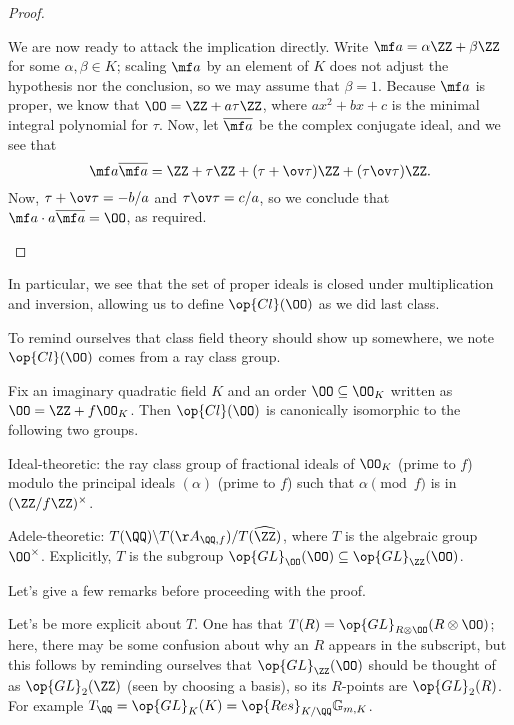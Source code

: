 \documentclass[../notes.tex]{subfiles}
\begin{document}
\begin{proof}
\begin{itemize}
		We are now ready to attack the implication directly. Write $\mf a=\alpha\ZZ+\beta\ZZ$ for some $\alpha,\beta\in K$; scaling $\mf a$ by an element of $K$ does not adjust the hypothesis nor the conclusion, so we may assume that $\beta=1$. Because $\mf a$ is proper, we know that $\OO=\ZZ+a\tau\ZZ$, where $ax^2+bx+c$ is the minimal integral polynomial for $\tau$. Now, let $\overline{\mf a}$ be the complex conjugate ideal, and we see that
		\[\mf a\overline{\mf a}=\ZZ+\tau\ZZ+(\tau+\ov\tau)\ZZ+(\tau\ov\tau)\ZZ.\]
		Now, $\tau+\ov\tau=-b/a$ and $\tau\ov\tau=c/a$, so we conclude that $\mf a\cdot a\overline{\mf a}=\OO$, as required.
		\qedhere
	\end{itemize}
\end{proof}
\begin{remark}
	In particular, we see that the set of proper ideals is closed under multiplication and inversion, allowing us to define $\op{Cl}(\OO)$ as we did last class.
\end{remark}
To remind ourselves that class field theory should show up somewhere, we note $\op{Cl}(\OO)$ comes from a ray class group.
\begin{proposition} \label{prop:better-order-class-group}
	Fix an imaginary quadratic field $K$ and an order $\OO\subseteq\OO_K$ written as $\OO=\ZZ+f\OO_K$. Then $\op{Cl}(\OO)$ is canonically isomorphic to the following two groups.
	\begin{listalph}
		\item Ideal-theoretic: the ray class group of fractional ideals of $\OO_K$ (prime to $f$) modulo the principal ideals $(\alpha)$ (prime to $f$) such that $\alpha\pmod f$ is in $(\ZZ/f\ZZ)^\times$.
		\item Adele-theoretic: $T(\QQ)\backslash T(\AA_{\QQ,f})/T(\widehat\ZZ)$, where $T$ is the algebraic group $\OO^\times$. Explicitly, $T$ is the subgroup $\op{GL}_\OO(\OO)\subseteq\op{GL}_\ZZ(\OO)$.
	\end{listalph}
\end{proposition}
Let's give a few remarks before proceeding with the proof.
\begin{remark} \label{rem:explicit-torus-order}
	Let's be more explicit about $T$. One has that $T(R)=\op{GL}_{R\otimes\OO}(R\otimes\OO)$; here, there may be some confusion about why an $R$ appears in the subscript, but this follows by reminding ourselves that $\op{GL}_\ZZ(\OO)$ should be thought of as $\op{GL}_2(\ZZ)$ (seen by choosing a basis), so its $R$-points are $\op{GL}_2(R)$. For example $T_\QQ=\op{GL}_K(K)=\op{Res}_{K/\QQ}\mathbb G_{m,K}$.
\end{remark}
\end{document}
